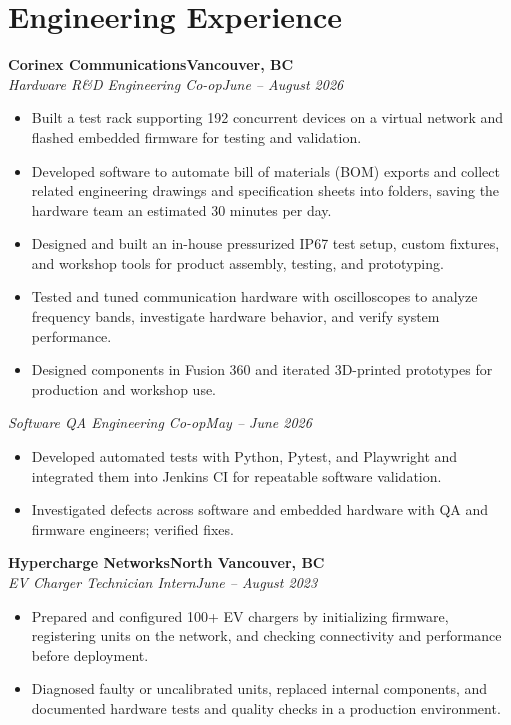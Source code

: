 \documentclass[10pt,letterpaper]{article}
\newcommand{\resumeItem}[1]{\item #1}
\begin{document}
\section*{Engineering Experience}
\textbf{Corinex Communications}\hfill\textbf{Vancouver, BC}\\
\textit{Hardware R\&D Engineering Co-op}\hfill\textit{June -- August 2026}
\begin{itemize}
\resumeItem{Built a test rack supporting 192 concurrent devices on a virtual network and flashed embedded firmware for testing and validation.}
\resumeItem{Developed software to automate bill of materials (BOM) exports and collect related engineering drawings and specification sheets into folders, saving the hardware team an estimated 30 minutes per day.}
\resumeItem{Designed and built an in-house pressurized IP67 test setup, custom fixtures, and workshop tools for product assembly, testing, and prototyping.}
\resumeItem{Tested and tuned communication hardware with oscilloscopes to analyze frequency bands, investigate hardware behavior, and verify system performance.}
\resumeItem{Designed components in Fusion 360 and iterated 3D-printed prototypes for production and workshop use.}
\end{itemize}
\textit{Software QA Engineering Co-op}\hfill\textit{May -- June 2026}
\begin{itemize}
\resumeItem{Developed automated tests with Python, Pytest, and Playwright and integrated them into Jenkins CI for repeatable software validation.}
\resumeItem{Investigated defects across software and embedded hardware with QA and firmware engineers; verified fixes.}
\end{itemize}
\textbf{Hypercharge Networks}\hfill\textbf{North Vancouver, BC}\\
\textit{EV Charger Technician Intern}\hfill\textit{June -- August 2023}
\begin{itemize}
\resumeItem{Prepared and configured 100+ EV chargers by initializing firmware, registering units on the network, and checking connectivity and performance before deployment.}
\resumeItem{Diagnosed faulty or uncalibrated units, replaced internal components, and documented hardware tests and quality checks in a production environment.}
\end{itemize}
\end{document}
